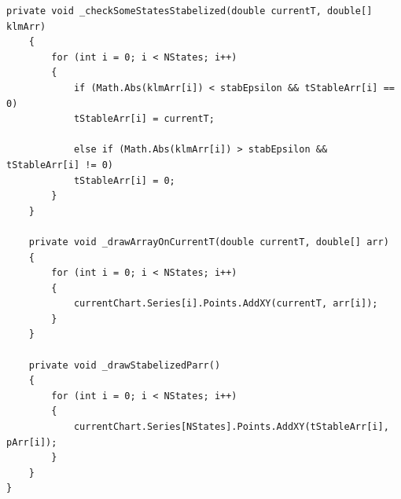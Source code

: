 \documentclass[14pt, a4paper]{extarticle}
\begin{document}
\begin{lstlisting}[caption = {Класс EmulationModel, используемый для расчетов и построения графиков}, label=lst:list1]
	private void _checkSomeStatesStabelized(double currentT, double[] klmArr)
	{
		for (int i = 0; i < NStates; i++)
		{
			if (Math.Abs(klmArr[i]) < stabEpsilon && tStableArr[i] == 0)
			tStableArr[i] = currentT;
			
			else if (Math.Abs(klmArr[i]) > stabEpsilon && tStableArr[i] != 0)
			tStableArr[i] = 0;
		}
	}
	
	private void _drawArrayOnCurrentT(double currentT, double[] arr)
	{
		for (int i = 0; i < NStates; i++)
		{
			currentChart.Series[i].Points.AddXY(currentT, arr[i]);
		}
	}
	
	private void _drawStabelizedParr()
	{
		for (int i = 0; i < NStates; i++)
		{
			currentChart.Series[NStates].Points.AddXY(tStableArr[i], pArr[i]);
		}
	}
}
\end{lstlisting}
\end{document}

